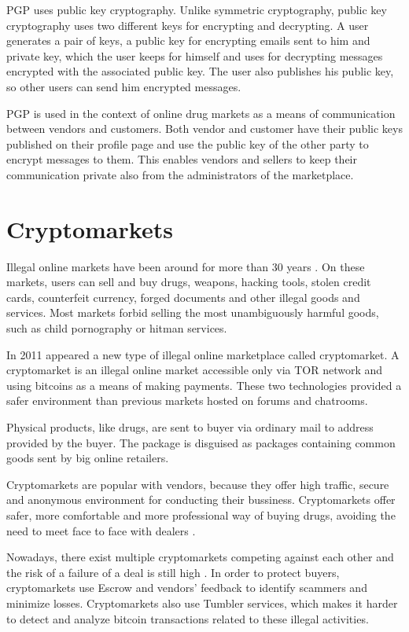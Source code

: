 \documentclass[
  digital, %
  table,   %
  lof,     %
  lot,     %
  oneside
]{fithesis3}
\begin{document}
PGP uses public key cryptography. Unlike symmetric cryptography, public key cryptography
uses two different keys for encrypting and decrypting.
A user generates a pair of keys, a public key for encrypting emails sent to him and private key, which the user
 keeps for himself and uses for decrypting messages encrypted with the associated public key.
 The user also publishes his public key, so other users can send him encrypted messages.

PGP is used in the context of online drug markets as a means of communication between vendors and customers.
Both vendor and customer have their public keys published on their profile page and use the public key of the other
party to encrypt messages to them. This enables vendors and sellers to keep their communication private also from the administrators of the marketplace.

\section{Cryptomarkets}

Illegal online markets have been around for more than 30 years \parencite{motoyama2011analysis}.
On these markets, users can sell and buy drugs, weapons, hacking tools, stolen credit cards,
counterfeit currency, forged documents and other illegal goods and services.
Most markets forbid selling the most unambiguously harmful goods, such as child pornography or hitman services.
 
In 2011 appeared a new type of illegal online marketplace called cryptomarket. 
A cryptomarket is an illegal online market accessible only via TOR network and using bitcoins
as a means of making payments. These two technologies provided a safer environment
than previous markets hosted on forums and chatrooms.

Physical products, like drugs, are sent to buyer via ordinary mail to address provided by the buyer.
The package is disguised as packages containing common goods sent by big online retailers.
\parencite{paquet2017cryptomarkets}

Cryptomarkets are popular with vendors,
because they offer high traffic, secure and anonymous environment for conducting their bussiness\parencite {van2014responsible}.
Cryptomarkets offer safer, more comfortable and more professional way of buying drugs, avoiding 
the need to meet face to face with dealers \parencite{barratt2014use}.

Nowadays, there exist multiple cryptomarkets competing against each other and the risk
of a failure of a deal is still high \parencite{wehinger2011dark}.
In order to protect buyers, cryptomarkets use Escrow and vendors' feedback to identify scammers and minimize losses.
Cryptomarkets also use Tumbler services, which makes it harder to detect and analyze bitcoin transactions
 related to these illegal activities.
\end{document}
